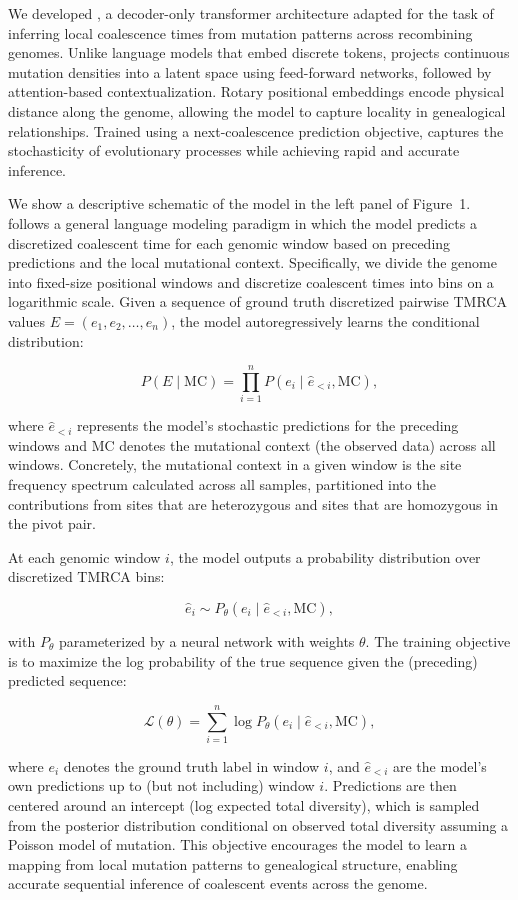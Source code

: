 \documentclass[9pt,twocolumn,twoside]{pnas-new}
\begin{document}
We developed \cxtkit, a decoder-only transformer architecture adapted for the task of inferring local coalescence times from mutation patterns across recombining genomes. Unlike 
language models that embed discrete tokens, \cxtkit projects continuous mutation densities into a latent space using feed-forward networks, followed by attention-based contextualization. Rotary positional embeddings encode physical distance along the genome, allowing the model to capture locality in genealogical relationships. Trained using a next-coalescence prediction objective, \cxtkit captures the stochasticity of evolutionary processes while achieving rapid and accurate inference.


We show a descriptive schematic of the model in the left panel of Figure~1.  
\cxtkit follows a general language modeling paradigm in which the model predicts 
a discretized coalescent time for each genomic window based on preceding predictions 
and the local mutational context. Specifically, we divide the genome into fixed-size 
positional windows and discretize coalescent times into bins on a 
logarithmic scale. Given a sequence of ground truth discretized pairwise TMRCA values  
\( E = (e_1, e_2, \dots, e_n) \), the model autoregressively learns the conditional 
distribution:

\[
P(E \mid \text{MC}) = \prod_{i=1}^{n} P(e_i \mid \hat{e}_{<i}, \text{MC}),
\]
 
where \( \hat{e}_{<i} \) represents the model's stochastic predictions for the preceding windows and \( \text{MC} \) denotes the mutational context (the observed data) across all windows. Concretely, the mutational context in a given window is the site frequency spectrum calculated across all samples, partitioned into the contributions from sites that are heterozygous and sites that are homozygous in the pivot pair.

At each genomic window \( i \), the model outputs a probability distribution over 
discretized TMRCA bins:

\[
\hat{e}_i \sim P_\theta(e_i \mid \hat{e}_{<i}, \text{MC}),
\]

with \( P_\theta \) parameterized by a neural network with weights $\theta$. The training objective is to maximize the log probability of the true sequence given the (preceding) predicted sequence:

\[
 \mathcal{L}(\theta) = \sum_{i=1}^{n} \log P_\theta(e_i \mid \hat{e}_{<i}, \text{MC}),
\]

where \( e_i \) denotes the ground truth label in window \( i \), and \( \hat{e}_{<i} \) 
are the model's own predictions up to (but not including) window $i$. Predictions are then 
centered around an intercept (log expected total diversity), which is sampled from the 
posterior distribution conditional on observed total diversity assuming a Poisson model of 
mutation.
This objective encourages the model to learn a mapping from local mutation patterns to
genealogical structure, enabling accurate sequential inference of coalescent events across the genome.
\end{document}
